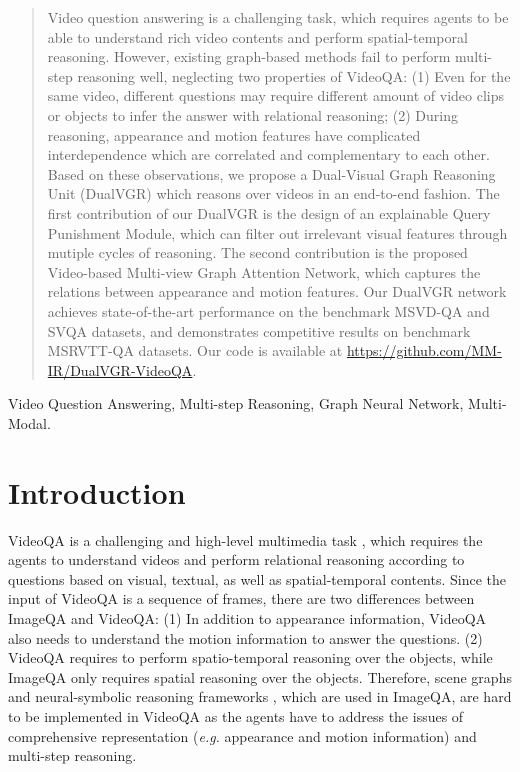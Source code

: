 \documentclass[journal]{IEEEtran}
\def \eg{\emph{e.g.}}
\begin{document}
\maketitle
\begin{abstract}
Video question answering is a challenging task, which requires agents to be able to understand rich video contents and perform spatial-temporal reasoning. However, existing graph-based methods fail to perform multi-step reasoning well, neglecting two properties of VideoQA: (1) Even for the same video, different questions may require different amount of video clips or objects to infer the answer with relational reasoning; (2) During reasoning, appearance and motion features have complicated interdependence which are correlated and complementary to each other. Based on these observations, we propose a Dual-Visual Graph Reasoning Unit (DualVGR) which reasons over videos in an end-to-end fashion. The first contribution of our DualVGR is the design of an explainable Query Punishment Module, which can filter out irrelevant visual features through mutiple cycles of reasoning. The second contribution is the proposed Video-based Multi-view Graph Attention Network, which captures the relations between appearance and motion features. Our DualVGR network achieves state-of-the-art performance on the benchmark MSVD-QA and SVQA datasets, and demonstrates competitive results on benchmark MSRVTT-QA datasets. Our code is available at \href{https://github.com/MM-IR/DualVGR-VideoQA}{https://github.com/MM-IR/DualVGR-VideoQA}.
\end{abstract}
\begin{IEEEkeywords}
Video Question Answering, Multi-step Reasoning, Graph Neural Network, Multi-Modal.
\end{IEEEkeywords}

\IEEEpeerreviewmaketitle

\section{Introduction}
VideoQA is a challenging and high-level multimedia task \cite{zhu2020multimedia}, which requires the agents to understand videos and perform relational reasoning according to questions based on visual, textual, as well as spatial-temporal contents. Since the input of VideoQA is a sequence of frames, there are two differences between ImageQA and VideoQA: (1) In addition to appearance information, VideoQA also needs to understand the motion information to answer the questions. (2) VideoQA requires to perform spatio-temporal reasoning over the objects, while ImageQA only requires spatial reasoning over the objects. Therefore, scene graphs \cite{teney2017graph, li2019relation, hu2019language} and neural-symbolic reasoning frameworks \cite{hu2017learning,yi2018neural,shi2019explainable,li2019perceptual}, which are used in ImageQA, are hard to be implemented in VideoQA as the agents have to address the issues of comprehensive representation (\eg{ appearance and motion information}) and multi-step reasoning. 
\end{document}
